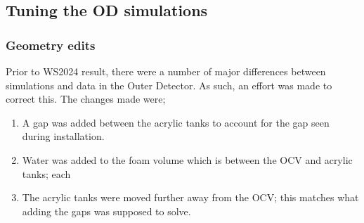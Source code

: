 \subsection{Tuning the OD simulations}
\subsubsection{Geometry edits}\label{sec:Veto/GeometryEdits}
Prior to WS2024 result, there were a number of major differences between simulations and data in the Outer Detector.
As such, an effort was made to correct this.
The changes made were;
\begin{enumerate}
	\item A gap was added between the acrylic tanks to account for the gap seen during installation.
	\item Water was added to the foam volume which is between the OCV and acrylic tanks; each
	\item The acrylic tanks were moved further away from the OCV; this matches what adding the gaps was supposed to solve.
\end{enumerate}

